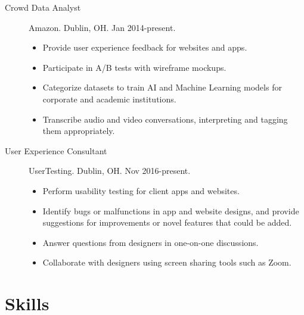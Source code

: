 \documentclass{article}
\begin{document}
\begin{description}
  \item[Crowd Data Analyst] Amazon. Dublin, OH. Jan 2014-present.
  \begin{itemize}
    \item Provide user experience feedback for websites and apps.
    \item Participate in A/B tests with wireframe mockups.
    \item Categorize datasets to train AI and Machine Learning models for corporate and academic institutions.
    \item Transcribe audio and video conversations, interpreting and tagging them appropriately.
  \end{itemize}
  \item[User Experience Consultant] UserTesting. Dublin, OH. Nov 2016-present.
  \begin{itemize}
    \item Perform usability testing for client apps and websites.
    \item Identify bugs or malfunctions in app and website designs, and provide suggestions for improvements or novel features that could be added.
    \item Answer questions from designers in one-on-one discussions.
    \item Collaborate with designers using screen sharing tools such as Zoom.
  \end{itemize}  
\end{description}

\vspace{-1em}
\section*{Skills}\vspace{-0.5em}
\end{document}
